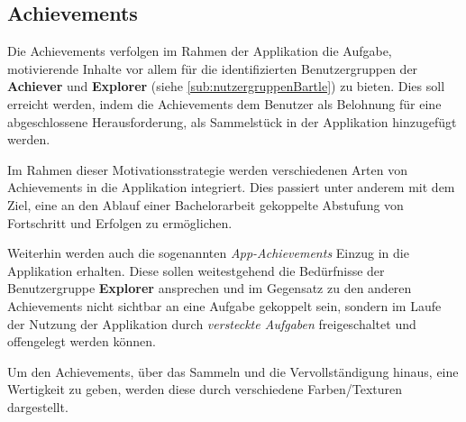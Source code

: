 \documentclass[bibliography=totoc,listof=totoc,BCOR=5mm,DIV=12,oneside]{scrbook}
\begin{document}
\subsection{Achievements} \label{sub:konzeptGamificationAchievements}
\par Die Achievements verfolgen im Rahmen der Applikation die Aufgabe, motivierende Inhalte vor allem für die identifizierten Benutzergruppen der \textbf{Achiever} und \textbf{Explorer} (siehe \ref{sub:nutzergruppenBartle}) zu bieten. Dies soll erreicht werden, indem die Achievements dem Benutzer als Belohnung für eine abgeschlossene Herausforderung, als Sammelstück in der Applikation hinzugefügt werden.
\par \medskip Im Rahmen dieser Motivationsstrategie werden verschiedenen Arten von Achievements in die Applikation integriert. Dies passiert unter anderem mit dem Ziel, eine an den Ablauf einer Bachelorarbeit gekoppelte Abstufung von Fortschritt und Erfolgen zu ermöglichen. 
\par Weiterhin werden auch die sogenannten \textit{App-Achievements} Einzug in die Applikation erhalten. Diese sollen weitestgehend die Bedürfnisse der Benutzergruppe \textbf{Explorer} ansprechen und im Gegensatz zu den anderen Achievements nicht sichtbar an eine Aufgabe gekoppelt sein, sondern im Laufe der Nutzung der Applikation durch \textit{versteckte Aufgaben} freigeschaltet und offengelegt werden können.

\par \medskip Um den Achievements, über das Sammeln und die Vervollständigung hinaus, eine Wertigkeit zu geben, werden diese durch verschiedene Farben/Texturen dargestellt. 
\end{document}

